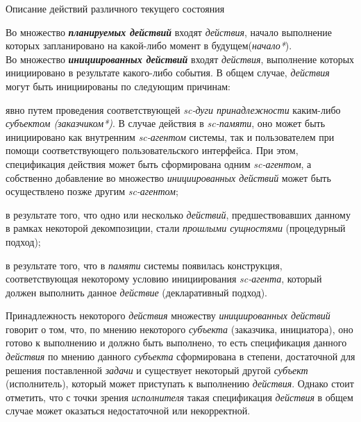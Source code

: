 \begin{frame}{Описание действий различного текущего состояния}
\topline
\justifying
\vspace{10mm}

    Во множество \textbf{\textit{планируемых действий}} входят \textit{действия}, начало выполнение которых запланировано на какой-либо момент в будущем(\textit{начало*}).\\
    Во множество \textbf{\textit{инициированных действий}} входят \textit{действия}, выполнение которых инициировано в результате какого-либо события.
    В общем случае, \textit{действия} могут быть инициированы по следующим причинам:
    \begin{textitemize}
	   \item явно путем проведения соответствующей \textit{sc-дуги принадлежности} каким-либо \textit{субъектом (заказчиком*)}. В случае действия в \textit{sc-памяти}, оно может быть инициировано как внутренним \textit{sc-агентом} системы, так и пользователем при помощи соответствующего пользовательского интерфейса. При этом, спецификация действия может быть сформирована одним \textit{sc-агентом}, а собственно добавление во множество \textit{инициированных действий} может быть осуществлено позже другим \textit{sc-агентом};
    \end{textitemize}
\end{frame}

\begin{frame}{}
\justifying
\vspace{10mm}

	\begin{textitemize}
	   \item в результате того, что одно или несколько \textit{действий}, предшествовавших данному в рамках некоторой декомпозиции, стали \textit{прошлыми сущностями} (процедурный подход);
	   \item в результате того, что в \textit{памяти} системы появилась конструкция, соответствующая некоторому условию инициирования \textit{sc-агента}, который должен выполнить данное \textit{действие} (декларативный подход).
	\end{textitemize}

    Принадлежность некоторого \textit{действия} множеству \textit{инициированных действий} говорит о том, что, по мнению некоторого \textit{субъекта} (заказчика, инициатора), оно готово к выполнению и должно быть выполнено, то есть спецификация данного \textit{действия} по мнению данного \textit{субъекта} сформирована в степени, достаточной для решения поставленной \textit{задачи} и существует некоторый другой \textit{субъект} (исполнитель), который может приступать к выполнению \textit{действия}. Однако стоит отметить, что с точки зрения \textit{исполнителя} такая спецификация \textit{действия} в общем случае может оказаться недостаточной или некорректной.\\
\end{frame}

